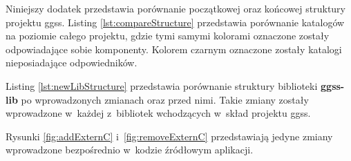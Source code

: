 Niniejszy dodatek przedstawia porównanie początkowej oraz końcowej struktury projektu \gls*{ggss}. Listing \ref{lst:compareStructure} przedstawia porównanie katalogów na poziomie całego projektu, gdzie tymi samymi kolorami oznaczone zostały odpowiadające sobie komponenty. Kolorem czarnym oznaczone zostały katalogi nieposiadające odpowiedników.

Listing \ref{lst:newLibStructure} przedstawia porównanie struktury biblioteki \textbf{ggss-lib} po wprowadzonych zmianach oraz przed nimi. Takie zmiany zostały wprowadzone w~każdej z~bibliotek wchodzących w~skład projektu \gls*{ggss}.


Rysunki \ref{fig:addExternC} i~\ref{fig:removeExternC} przedstawiają jedyne zmiany wprowadzone bezpośrednio w~kodzie źródłowym aplikacji.

\newpage




\def\redcolor{\color{red}}
\def\blackcolor{\color{black}}
\def\greencolor{\color{green}}
\def\purplecolor{\color{plum(traditional)}}
\def\bluecolor{\color{blue}}
\def\ambercolor{\color{amber(sae/ece)}}
\def\darkgreencolor{\color{cadmiumgreen}}
\def\capricolor{\color{capri}}
\def\magentacolor{\color{magenta}}
\def\sinopiacolor{\color{sinopia}}
\def\yellowcolor{\color{salmon}}
\def\fyellowcolor{\color{fyellow}}

